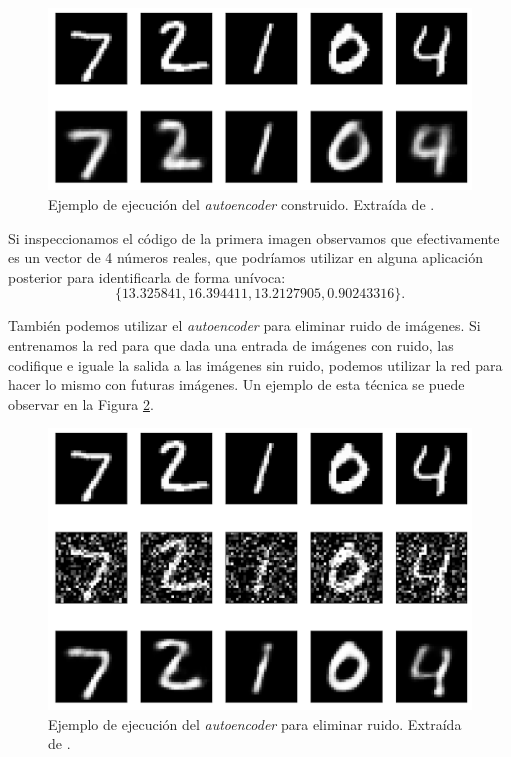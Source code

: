 \documentclass[
  a4paper,
  12pt,
  spanish,
]{scrartcl}
\theoremstyle{teorema-style}
\begin{document}
\begin{figure}[h]
  \centering
  \includegraphics[width=.7\textwidth]{img/autoencoder_ex1}
  \caption{Ejemplo de ejecución del \textit{autoencoder} construido. Extraída de \parencite{arden_autoencoder_2017}.}
  \label{fig:autoencoder_ex1}
\end{figure}

Si inspeccionamos el código de la primera imagen observamos que efectivamente es un vector de 4 números reales, que podríamos utilizar en alguna aplicación posterior para identificarla de forma unívoca:
$$\{13.325841  , 16.394411  , 13.2127905 ,  0.90243316\}.$$

También podemos utilizar el \textit{autoencoder} para eliminar ruido de
imágenes. Si entrenamos la red para que dada una entrada de imágenes con ruido, las codifique e iguale la salida a las imágenes sin ruido, podemos utilizar la red para hacer lo mismo con futuras imágenes. Un ejemplo de esta técnica se puede observar en la Figura \ref{fig:autoencoder_ex2}.

\begin{figure}[h]
  \centering
  \includegraphics[width=.7\textwidth]{img/autoencoder_ex2}
  \caption{Ejemplo de ejecución del \textit{autoencoder} para eliminar ruido. Extraída de \parencite{arden_autoencoder_2017}.}
  \label{fig:autoencoder_ex2}
\end{figure}
\end{document}
